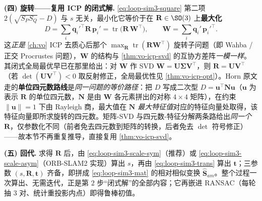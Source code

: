 \begin{derivation}
\textbf{(四) 旋转——复用 ICP 的闭式解.}\;
\cref{eq:loop-sim3-square} 第二项 $2(\sqrt{S_PS_Q}-D)$ 与 $s$ 无关，最小化它等价于在 $\mathbf R\in\SO(3)$ 上\textbf{最大化}
\begin{equation}
  D=\sum_i\mathbf q_i'^\top\mathbf R\,\mathbf p_i'=\operatorname{tr}\!\big(\mathbf R\,\mathbf W^\top\big),\qquad
  \mathbf W=\sum_i\mathbf q_i'\,\mathbf p_i'^\top .
  \label{eq:loop-sim3-rot}
\end{equation}
这\emph{正是} \cref{ch:vo} ICP 去质心后那个 $\max_{\mathbf R}\operatorname{tr}(\mathbf R\mathbf W^\top)$ 旋转子问题（即 Wahba / 正交 Procrustes 问题），$\mathbf W$ 的结构与 \cref{thm:vo-icp-svd} 的互协方差阵\emph{一模一样}。其闭式全局最优早已在那里给出：对 $\mathbf W$ 作 SVD $\mathbf W=\mathbf U\boldsymbol\Sigma\mathbf V^\top$，则 $\mathbf R=\mathbf U\mathbf V^\top$（若 $\det(\mathbf U\mathbf V^\top)<0$ 取反射修正，全局最优性见 \cref{thm:vo-icp-opt}）\cite{arun1987leastsquares}。Horn 原文走的\textbf{单位四元数路线}是\emph{同一问题的等价路径}\cite{horn1987closed}：把 $D$ 写成二次型 $D=\mathbf u^\top\mathbf N\mathbf u$（$\mathbf u$ 为表示 $\mathbf R$ 的单位四元数，$\mathbf N$ 是由 $\mathbf W$ 各元素拼出的对称 $4\times4$ 矩阵），在约束 $\lVert\mathbf u\rVert=1$ 下由 Rayleigh 商，最大值在 $\mathbf N$ \emph{最大特征值}对应的特征向量处取得，该特征向量即所求旋转的四元数。矩阵-SVD 与四元数-特征分解两条路给出\emph{同一个} $\mathbf R$，仅参数化不同（前者免去四元数到矩阵的转换，后者免去 $\det$ 符号修正）——故本节不再重复推导，直接复用 \cref{thm:vo-icp-svd}。

\textbf{(五) 回代.}\;
求得 $\mathbf R$ 后，由 \cref{eq:loop-sim3-scale-sym}（推荐）或 \cref{eq:loop-sim3-scale-asym}（ORB-SLAM2 实现）算出 $s$，再由 \cref{eq:loop-sim3-trans} 算出 $\mathbf t$；三参数 $(s,\mathbf R,\mathbf t)$ 齐备，即拼成 \cref{eq:loop-sim3-mat} 的相对相似变换 $\hat{\mathbf S}_{am}$。整个过程一次算出、无需迭代，正是第 $2$ 步“闭式解”的全部内容；它再嵌进 RANSAC（每轮抽 $3$ 对、统计重投影内点）即得鲁棒初值。
\end{derivation}

